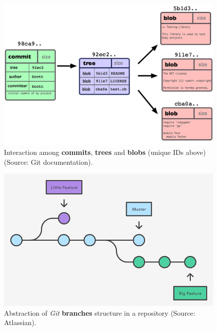 \documentclass[a4paper, 12pt]{book}
\begin{document}
\begin{figure}
  \centering
  \includegraphics[width=12cm, keepaspectratio]{img/git-objs-example}
  \caption{Interaction among \textbf{commits}, \textbf{trees} and \textbf{blobs} (unique IDs above) (Source: Git documentation).}
  \label{fig:git-objs-example}
\end{figure}
\begin{figure}
  \centering
  \includegraphics[width=12cm, keepaspectratio]{img/branches-example-atlassian}
  \caption{Abstraction of \emph{Git} \textbf{branches} structure in a repository (Source: Atlassian).}
  \label{fig:git-branches-example}
\end{figure}
\end{document}
